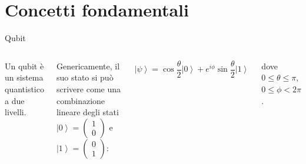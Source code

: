 \documentclass{beamer}
\newcommand{\ket}[1]{\left| #1 \right \rangle}
\renewcommand{\'}[0]{\`}
\begin{document}
		
	
	


\section{Concetti fondamentali}

	\begin{frame}{Qubit}

	\begin{columns}
 
	
	\pause
	
	Un qubit è un sistema quantistico a due livelli. \pause
	\vspace{0.5cm}
	
	Genericamente, il suo stato si può scrivere come una combinazione lineare degli stati $ \ket{0} = \begin{pmatrix} 1 \\ 0 \end{pmatrix} $ e $\ket{1} = \begin{pmatrix} 0 \\ 1 \end{pmatrix}  $: 
	
	\vspace{0.1cm}
	\begin{equation*}
 	\ket{\psi}= \cos{ \frac{\theta}{2}} \ket{0} + e^{i \phi} \sin{ \frac{\theta}{2}} \ket{1} 
	\end{equation*}
	\vspace{0.1cm}
		
	dove $ 0\leq \theta \leq \pi$, $0\leq \phi < 2\pi$. 


\end{columns}
\end{frame}
\end{document}
